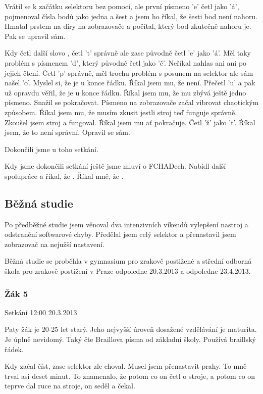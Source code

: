 Vrátil se k začátku selektoru bez pomoci, ale první písmeno 'e' četl jako 'á', pojmenoval čísla bodů jako jedna a šest a jsem ho říkal, že šesti bod není nahoru.  Hmatal prstem na díry na zobrazovače a počítal, který bod zkutečně nahoru je.  Pak se upravil sám.

Kdy četl další slovo , četl 't' správně ale zase původně četl 'e' jako 'á'.  Měl taky problém s písmenem 'ď', který původně četl jako 'č'.  Neříkal nahlas ani  ani  po jejich čtení.  Četl 'p' správně, měl trochu problém s posunem na selektor ale sám našel 'o'.  Myslel si, že je u konce řádku.  Říkal jsem mu, že není. Přečetl 'u' a pak už opravdu věřil, že je u konce řádku. Říkal jsem mu, že mu zbývá ještě jedno písmeno.  Snažil se pokračovat. Písmeno na zobrazovače začal vibrovat chaotickým způsobem. Říkal jsem mu, že musím zkusit jestli stroj teď funguje správně. Zkoušel jsem stroj a fungoval. Říkal jsem mu ať pokračuje. Četl 'ž' jako 't'. Říkal jsem, že to není správní. Opravil se sám.

Dokončili jsme u toho setkání.

Kdy jsme dokončili setkání ještě jsme mluví o FCHADech.  Nabídl další spolupráce a říkal, že . Říkal mně, že .

\subsection{Běžná studie}

Po předběžné studie jsem věnoval dva intenzivních víkendů vylepšení nastroj a odstranění softwarové chyby.  Předělal jsem celý selektor a přenastavil jsem zobrazovač na nejužší nastavení.

Běžná studie se proběhla v gymnasium pro zrakově postižené a střední odborná škola pro zrakově postižení v Praze odpoledne 20.3.2013 a odpoledne 23.4.2013.

\subsubsection{Žák 5}
Setkání 12:00 20.3.2013

Paty žák je 20-25 let starý.  Jeho nejvyšší úroveň dosažené vzdělávání je maturita. Je úplně nevidomý.  Taký čte Braillova písma od základní školy.  Používá braillský řádek.

Kdy začal číst, zase selektor zle choval.  Musel jsem přenastavit prahy.  To mně trval asi deset minut.  To znamenalo, že potom co on četl o stroje, a potom co on teprve dal ruce na stroje, on seděl a čekal.

